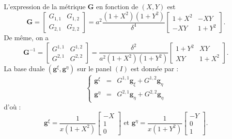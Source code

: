 L'expression de la métrique $\mathbf{G}$ en fonction de $(X,Y)$ est
\begin{equation}
\mathbf{G} = \begin{bmatrix}
G_{1,1} & G_{1,2} \\ G_{2,1} & G_{2,2}
\end{bmatrix} 
= a^2 \dfrac{(1+X^2)(1+Y^2)}{\delta^4} \begin{bmatrix}
1+X^2 & -XY \\ -XY & 1+Y^2
\end{bmatrix} .
\end{equation}
De même, on a
\begin{equation}
\mathbf{G}^{-1} = \begin{bmatrix}
G^{1,1} & G^{1,2} \\ G^{2,1} & G^{2,2}
\end{bmatrix} = \dfrac{\delta^2}{a^2 (1+X^2)(1+Y^2)} \begin{bmatrix}
1+Y^2 & XY \\ XY & 1+X^2
\end{bmatrix} .
\label{eq: metrique inverse}
\end{equation}
La base duale $(\mathbf{g}^{\xi}, \mathbf{g}^{\eta})$ sur le panel $(I)$ est donnée par :
\begin{equation}
\left\lbrace
\begin{array}{rcl}
\mathbf{g}^{\xi} & = & G^{1,1} \mathbf{g}_{\xi} + G^{1,2} \mathbf{g}_{\eta} \\
\mathbf{g}^{\eta} & = & G^{2,1} \mathbf{g}_{\eta} + G^{2,2} \mathbf{g}_{\eta}
\end{array}
\right.
\end{equation}
d'où :
\begin{equation}
\mathbf{g}^{\xi} = \dfrac{1}{x(1+X^2)}\begin{bmatrix}
-X \\ 1 \\ 0
\end{bmatrix} \text{ et } \mathbf{g}^{\eta} = \dfrac{1}{x(1+Y^2)}\begin{bmatrix}
-Y \\ 0 \\ 1
\end{bmatrix} .
\label{eq: base duale I}
\end{equation}



